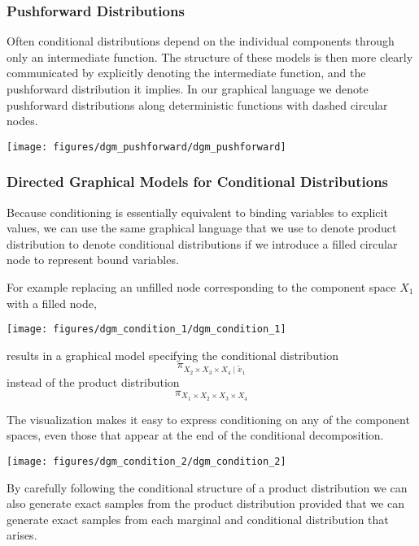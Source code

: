\documentclass[]{article}
\begin{document}
\hypertarget{pushforward-distributions}{%
\subsubsection{Pushforward
Distributions}\label{pushforward-distributions}}

Often conditional distributions depend on the individual components
through only an intermediate function. The structure of these models is
then more clearly communicated by explicitly denoting the intermediate
function, and the pushforward distribution it implies. In our graphical
language we denote pushforward distributions along deterministic
functions with dashed circular nodes.

\texttt{[image: figures/dgm\_pushforward/dgm\_pushforward]}

\hypertarget{directed-graphical-models-for-conditional-distributions}{%
\subsubsection{Directed Graphical Models for Conditional
Distributions}\label{directed-graphical-models-for-conditional-distributions}}

Because conditioning is essentially equivalent to binding variables to
explicit values, we can use the same graphical language that we use to
denote product distribution to denote conditional distributions if we
introduce a filled circular node to represent bound variables.

For example replacing an unfilled node corresponding to the component
space \(X_{1}\) with a filled node,

\texttt{[image: figures/dgm\_condition\_1/dgm\_condition\_1]}

results in a graphical model specifying the conditional distribution \[
\pi_{X_{2} \times X_{3} \times X_{4} \mid \tilde{x}_{1}}
\] instead of the product distribution \[
\pi_{X_{1} \times X_{2} \times X_{3} \times X_{4}}
\]

The visualization makes it easy to express conditioning on any of the
component spaces, even those that appear at the end of the conditional
decomposition.

\texttt{[image: figures/dgm\_condition\_2/dgm\_condition\_2]}

By carefully following the conditional structure of a product
distribution we can also generate exact samples from the product
distribution provided that we can generate exact samples from each
marginal and conditional distribution that arises.
\end{document}
